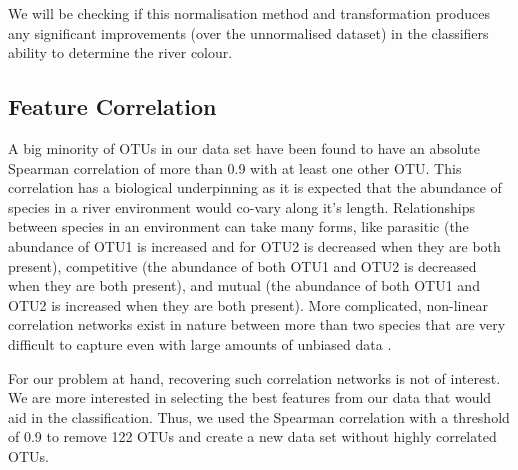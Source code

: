 We will be checking if this normalisation method and transformation produces any significant improvements (over the unnormalised dataset) in the classifiers ability to determine the river colour. 



\subsection{Feature Correlation}

A big minority of OTUs in our data set have been found to have an absolute Spearman correlation of more than 0.9 with at least one other OTU. This correlation has a biological underpinning as it is expected that the abundance of species in a river environment would co-vary along it's length. Relationships between species in an environment can take many forms, like parasitic (the abundance of OTU1 is increased and for OTU2 is decreased when they are both present), competitive (the abundance of both OTU1 and OTU2 is decreased when they are both present), and mutual (the abundance of both OTU1 and OTU2 is increased when they are both present). More complicated, non-linear correlation networks exist in nature between more than two species that are very difficult to capture even with large amounts of unbiased data \cite{weiss_correlation_2016}. 



For our problem at hand, recovering such correlation networks is not of interest. We are more interested in selecting the best features from our data that would aid in the classification. Thus, we used the Spearman correlation with a threshold of 0.9 to remove 122 OTUs and create a new data set without highly correlated OTUs. 










